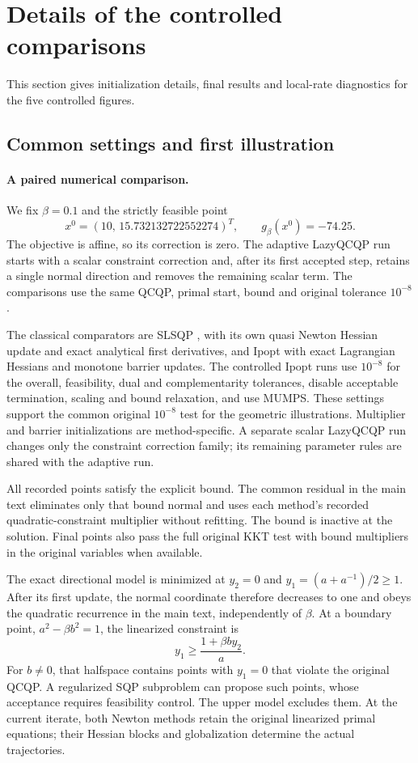 \documentclass[pdflatex,sn-mathphys-num]{sn-jnl}
\theoremstyle{thmstyleone}
\theoremstyle{thmstylethree}
\begin{document}
\section{Details of the controlled comparisons}\label{supp:controlled-details}
This section gives initialization details, final results and local-rate
diagnostics for the five controlled figures.

\subsection{Common settings and first illustration}

\paragraph{A paired numerical comparison.}
We fix $\beta=0.1$ and the strictly feasible point
\[
 x^0=(10,\,15.732132722552274)^T,
 \qquad g_\beta(x^0)=-74.25.
\]
The objective is affine, so its correction is zero. The adaptive
LazyQCQP run starts with a scalar constraint correction and, after its
first accepted step, retains a single normal direction and removes the
remaining scalar term. The comparisons use the same QCQP, primal start, bound and original
tolerance $10^{-8}$.

The classical comparators are SLSQP \citep{Kraft1988}, with its own quasi Newton Hessian
update and exact analytical first derivatives, and Ipopt with exact
Lagrangian Hessians and monotone barrier updates. The controlled Ipopt
runs use $10^{-8}$ for the overall, feasibility, dual and complementarity
tolerances, disable acceptable termination, scaling and bound relaxation,
and use MUMPS. These settings support the common original $10^{-8}$ test
for the geometric illustrations. Multiplier and barrier initializations
are method-specific. A separate scalar LazyQCQP run changes only the
constraint correction family; its remaining parameter rules are shared
with the adaptive run.


All recorded points satisfy the explicit bound. The common residual
in the main text eliminates only that bound normal and uses each
method's recorded quadratic-constraint multiplier without refitting.
The bound is inactive at the solution. Final points also pass the
full original KKT test with bound multipliers in the original variables
when available.

The exact directional model is minimized at $y_2=0$ and
$y_1=(a+a^{-1})/2\geq1$. After its first update, the normal
coordinate therefore decreases to one and obeys the quadratic
recurrence in the main text, independently of $\beta$.
At a boundary point, $a^2-\beta b^2=1$, the linearized constraint is
\[
 y_1\geq\frac{1+\beta b y_2}{a}.
\]
For $b\ne0$, that halfspace contains points with $y_1=0$ that violate
the original QCQP. A regularized SQP subproblem can propose such points,
whose acceptance requires feasibility control. The upper model excludes them. At the current iterate, both Newton methods retain the
original linearized primal equations; their Hessian blocks and
globalization determine the actual trajectories.
\end{document}
